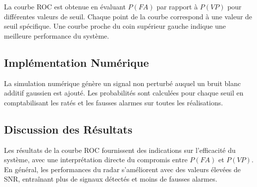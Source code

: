La courbe ROC est obtenue en évaluant \( P(FA) \) par rapport à \( P(VP) \) pour différentes valeurs de seuil. Chaque point de la courbe correspond à une valeur de seuil spécifique. Une courbe proche du coin supérieur gauche indique une meilleure performance du système.

\subsection{Implémentation Numérique}

La simulation numérique génère un signal non perturbé auquel un bruit blanc additif gaussien est ajouté. Les probabilités sont calculées pour chaque seuil en comptabilisant les ratés et les fausses alarmes sur toutes les réalisations.

\subsection{Discussion des Résultats}

Les résultats de la courbe ROC fournissent des indications sur l'efficacité du système, avec une interprétation directe du compromis entre \( P(FA) \) et \( P(VP) \). En général, les performances du radar s'améliorent avec des valeurs élevées de SNR, entraînant plus de signaux détectés et moins de fausses alarmes.

